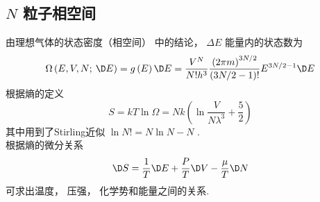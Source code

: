 \subsection{$N$ 粒子相空间}

  由理想气体的状态密度（相空间）%
  中的结论， $\Delta E$ 能量内的状态数为
  \begin{equation}
    \Omega \left( {E,V,N;{\kern 1pt} {\kern 1pt} \D E} \right) = g\left( E \right)\D E = \frac{{{V^N}}}{{N!{h^3}}}\frac{{{{\left( {2\pi m} \right)}^{3N/2}}}}{{\left( {3N/2 - 1} \right)!}}{E^{3N/2 - 1}}\D E
  \end{equation}
  根据熵的定义%
  \begin{equation}
    S = kT\ln \Omega  = Nk\left( {\ln \frac{V}{{N{\lambda ^3}}} + \frac{5}{2}} \right)
  \end{equation}
  其中用到了Stirling近似%
   $\ln N! = N\ln N - N$ . \\
   根据熵的微分关系
   \begin{equation}
     \D S = \frac{1}{T}\D E + \frac{P}{T}\D V - \frac{\mu }{T}\D N
   \end{equation}
   可求出温度， 压强， 化学势和能量之间的关系.
